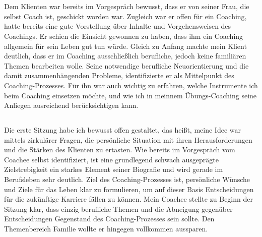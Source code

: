 \documentclass[11pt,a4paper]{article}
\begin{document}
\section*{\color{MidnightBlue}{Coaching-Sitzungen}}



\subsection*{\color{Orange}{Vorgespräch}}

Dem Klienten war bereits im Vorgespräch bewusst, dass er von seiner Frau, die selbst Coach ist, geschickt worden war. Zugleich war er offen für ein Coaching, hatte bereits eine gute Vorstellung über Inhalte und Vorgehensweisen des Coachings. Er schien die Einsicht gewonnen zu haben, dass ihm ein Coaching allgemein für sein Leben gut tun würde. Gleich zu Anfang machte mein Klient deutlich, dass er im Coaching ausschließlich berufliche, jedoch keine familiären Themen bearbeiten wolle. Seine notwendige berufliche Neuorientierung und die damit zusammenhängenden Probleme, identifizierte er als Mittelpunkt des Coaching-Prozesses. Für ihn war auch wichtig zu erfahren, welche Instrumente ich beim Coaching einsetzen möchte, und wie ich in meinnem Übungs-Coaching seine Anliegen ausreichend berücksichtigen kann. 


\subsection*{\color{Orange}{Erste Sitzung: Posititionsbestimmung}}

Die erste Sitzung habe ich bewusst offen gestaltet, das heißt, meine Idee war mittels zirkulärer Fragen, die persönliche Situation mit ihren Herausforderungen und die Stärken des Klienten zu ertasten. Wie bereits im Vorgespräch vom Coachee selbst identifiziert, ist eine grundlegend schwach ausgeprägte Zielstrebigkeit ein starkes Element seiner Biografie und wird gerade im Berufsleben sehr deutlich. Ziel des Coaching-Prozesses ist, persönliche Wünsche und Ziele für das Leben klar zu formulieren, um auf dieser Basis Entscheidungen für die zukünftige Karriere fällen zu können. Mein Coachee stellte zu Beginn der Sitzung klar, dass einzig berufliche Themen und die Abneigung gegenüber Entscheidungen Gegenstand des Coaching-Prozesses sein sollte. Den Themenbereich Familie wollte er hingegen vollkommen aussparen.
\end{document}
